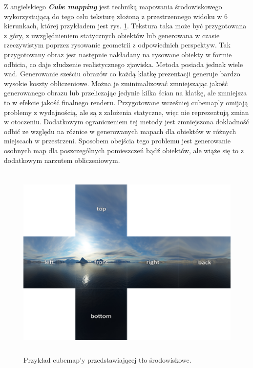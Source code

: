 \begin{itemize}
	Z angielskiego \emph{\textbf{Cube mapping}} jest techniką mapowania środowiskowego wykorzystującą do tego celu teksturę złożoną z przestrzennego widoku w 6 kierunkach, której przykładem jest rys. \ref{intro-cubemap}. Tekstura taka może być przygotowana z góry, z uwzględnieniem statycznych obiektów lub generowana w czasie rzeczywistym poprzez rysowanie geometrii z odpowiednich perspektyw. Tak przygotowany obraz jest następnie nakładany na rysowane obiekty w formie odbicia, co daje złudzenie realistycznego zjawiska.
	Metoda posiada jednak wiele wad. Generowanie sześciu obrazów co każdą klatkę prezentacji generuje bardzo wysokie koszty obliczeniowe. Można je zminimalizować zmniejszając jakość generowanego obrazu lub przeliczając jedynie kilka ścian na klatkę, ale zmniejsza to w efekcie jakość finalnego renderu. Przygotowane wcześniej cubemap'y omijają problemy z wydajnością, ale są z założenia statyczne, więc nie reprezentują zmian w otoczeniu. Dodatkowym ograniczeniem tej metody jest zmniejszona dokładność odbić ze względu na różnice w generowanych mapach dla obiektów w różnych miejscach w przestrzeni. Sposobem obejścia tego problemu jest generowanie osobnych map dla poszczególnych pomieszczeń bądź obiektów, ale wiąże się to z dodatkowym narzutem obliczeniowym.
	
	\vfill
	\clearpage
	
	\begin{figure}[htbp]
		\centering
		\includegraphics[width=5.14673in,height=3.85833in]{images/10_cubemap_environment.png}
		\caption{Przykład cubemap'y przedstawiającej tło środowiskowe.}
		\label{intro-cubemap}
	\end{figure}


\end{itemize}
